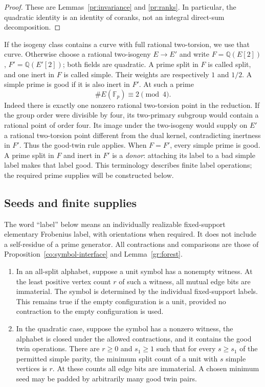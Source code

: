 \begin{proof}
These are Lemmas~\ref{pr:invariance} and \ref{pr:ranks}.  In particular,
the quadratic identity is an identity of coranks, not an integral
direct-sum decomposition.
\end{proof}

If the isogeny class contains a curve with full rational two-torsion, we use
that curve.  Otherwise choose a rational two-isogeny $E\to E'$ and write
$F=\mathbb Q(E[2])$, $F'=\mathbb Q(E'[2])$; both fields are quadratic.
A prime split in $F$ is called split, and one inert in $F$ is called simple.
Their weights are respectively $1$ and $1/2$.  A simple prime is good if it
is also inert in $F'$.  At such a prime
\begin{equation}\label{pw:good-simple}
 \#E(\mathbb F_p)\equiv2\pmod4.
\end{equation}
Indeed there is exactly one nonzero rational two-torsion point in the
reduction.  If the group order were divisible by four, its two-primary
subgroup would contain a rational point of order four.  Its image under the
two-isogeny would supply on $E'$ a rational two-torsion point different from
the dual kernel, contradicting inertness in $F'$.  Thus the good-twin rule
applies.  When $F=F'$, every simple prime is good.
A prime split in $F$ and inert in $F'$ is a \emph{donor}: attaching its
label to a bad simple label makes that label good.  This terminology
describes finite label operations; the required prime supplies will be
constructed below.

\subsection{Seeds and finite supplies}\label{pw:seeds-section}

The word ``label'' below means an individually realizable fixed-support
elementary Frobenius label, with orientations when required.  It does not
include a self-residue of a prime generator.  All contractions and
comparisons are those of Proposition~\ref{co:symbol-interface} and
Lemma~\ref{gr:forest}.

\begin{lemma}\label{pw:minimum-seeds}
\begin{enumerate}
\item In an all-split alphabet, suppose a unit symbol has a nonempty
witness.  At the least positive vertex count $r$ of such a witness, all
mutual edge bits are immaterial.  The symbol is determined by the individual
fixed-support labels.  This remains true if the empty configuration is a
unit, provided no contraction to the empty configuration is used.
\item In the quadratic case, suppose the symbol has a nonzero witness,
the alphabet is closed under the allowed contractions, and it contains
the good twin operations.  There are
$r\ge0$ and $s_1\ge1$ such that for every $s\ge s_1$ of the permitted simple
parity, the minimum split count of a unit with $s$ simple vertices is $r$.
At these counts all edge bits are immaterial.  A chosen minimum seed may be
padded by arbitrarily many good twin pairs.
\end{enumerate}
\end{lemma}

